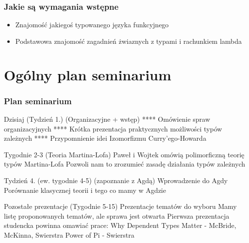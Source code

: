 \documentclass{beamer}
\begin{document}
\begin{frame}

\frametitle{Jakie są wymagania wstępne}

\begin{itemize}
\item Znajomość jakiegoś typowanego języka funkcyjnego
\item Podstawowa znajomość zagadnień żwiaznych z typami i rachunkiem lambda
\end{itemize}

\end{frame}


\section{Ogólny plan seminarium}

\begin{frame}

\frametitle{Plan seminarium}


\begin{block}{Dzisiaj (Tydzień 1.) (Organizacyjne + wstęp)}
**** Omówienie spraw organizacyjnych
**** Krótka prezentacja praktycznych możliwości typów zależnych 
**** Przypomnienie idei Izomorfizmu Curry'ego-Howarda
\end{block}

\begin{block}{Tygodnie 2-3 (Teoria Martina-Lofa)}
Paweł i Wojtek omówią polimorficzną teorię typów Martina-Lofa
     Pozwoli nam to zrozumieć zasadę działania typów zależnych
\end{block}

\begin{block}{Tydzień 4. (ew. tygodnie 4-5) (zapoznanie z Agdą)}
Wprowadzenie do Agdy \\
Porównanie klasycznej teorii i tego co mamy w Agdzie
\end{block}

\begin{block}{Pozostałe prezentacje (Tygodnie 5-15)}
Prezentacje tematów do wyboru
Mamy listę proponowanych tematów, ale sprawa jest otwarta
Pierwsza prezentacja studencka powinna omawiać prace:
  Why Dependent Types Matter - McBride, McKinna, Swierstra
  Power of Pi - Swierstra
\end{block}


\end{frame}
\end{document}
